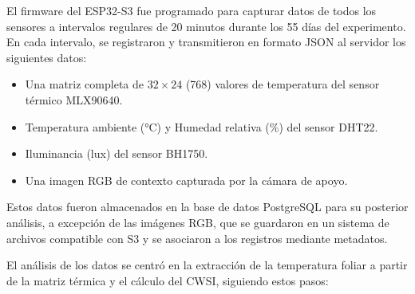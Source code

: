 El firmware del ESP32-S3 fue programado para capturar datos de todos los sensores a intervalos regulares de 20 minutos durante los 55 días del experimento. En cada intervalo, se registraron y transmitieron en formato JSON al servidor los siguientes datos:
\begin{itemize}
    \item Una matriz completa de $32 \times 24$ (768) valores de temperatura del sensor térmico MLX90640.
    \item Temperatura ambiente (°C) y Humedad relativa (\%) del sensor DHT22.
    \item Iluminancia (lux) del sensor BH1750.
    \item Una imagen RGB de contexto capturada por la cámara de apoyo.
\end{itemize}
Estos datos fueron almacenados en la base de datos PostgreSQL para su posterior análisis, a excepción de las imágenes RGB, que se guardaron en un sistema de archivos compatible con S3 y se asociaron a los registros mediante metadatos.

El análisis de los datos se centró en la extracción de la temperatura foliar a partir de la matriz térmica y el cálculo del CWSI, siguiendo estos pasos:

